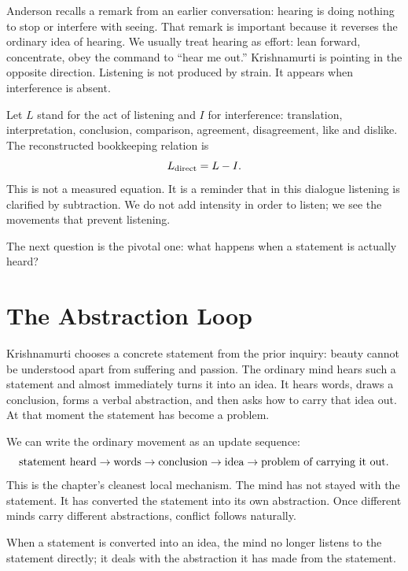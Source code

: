 Anderson recalls a remark from an earlier conversation: hearing is doing nothing to stop or interfere with seeing. That remark is important because it reverses the ordinary idea of hearing. We usually treat hearing as effort: lean forward, concentrate, obey the command to ``hear me out.'' Krishnamurti is pointing in the opposite direction. Listening is not produced by strain. It appears when interference is absent.

Let \(L\) stand for the act of listening and \(I\) for interference: translation, interpretation, conclusion, comparison, agreement, disagreement, like and dislike. The reconstructed bookkeeping relation is
\begin{equation}
L_{\rm direct}=L-I .
\end{equation}
This is not a measured equation. It is a reminder that in this dialogue listening is clarified by subtraction. We do not add intensity in order to listen; we see the movements that prevent listening.

The next question is the pivotal one: what happens when a statement is actually heard?

\section{The Abstraction Loop}

Krishnamurti chooses a concrete statement from the prior inquiry: beauty cannot be understood apart from suffering and passion. The ordinary mind hears such a statement and almost immediately turns it into an idea. It hears words, draws a conclusion, forms a verbal abstraction, and then asks how to carry that idea out. At that moment the statement has become a problem.

We can write the ordinary movement as an update sequence:
\begin{equation}
\hbox{statement heard}
\to
\hbox{words}
\to
\hbox{conclusion}
\to
\hbox{idea}
\to
\hbox{problem of carrying it out}.
\end{equation}
This is the chapter's cleanest local mechanism. The mind has not stayed with the statement. It has converted the statement into its own abstraction. Once different minds carry different abstractions, conflict follows naturally.

\begin{proposition}
When a statement is converted into an idea, the mind no longer listens to the statement directly; it deals with the abstraction it has made from the statement.
\end{proposition}

